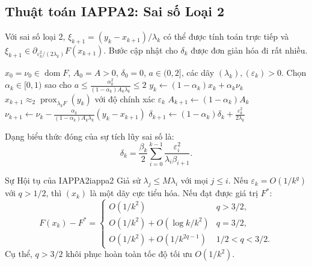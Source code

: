 \documentclass[12pt, a4paper]{article}
\newcommand{\prox}{\operatorname{prox}}
\newcommand{\dom}{\operatorname{dom}}
\begin{document}
\subsection{Thuật toán IAPPA2: Sai số Loại 2}

Với sai số loại 2, $\xi_{k+1}=(y_k-x_{k+1})/\lambda_k$ có thể được tính toán trực tiếp
và $\xi_{k+1}\in\partial_{\varepsilon_k^2/(2\lambda_k)}F(x_{k+1})$.
Bước cập nhật cho $\delta_k$ được đơn giản hóa đi rất nhiều.

\begin{algorithm}[H]
\caption{IAPPA2 --- Thuật toán PPA Gia tốc Không chính xác với Sai số Loại 2}
\label{alg:iappa2}
\begin{algorithmic}[1]
\Require $x_0=\nu_0\in\dom F$, $A_0=A>0$, $\delta_0=0$, $a\in(0,2]$,
         các dãy $(\lambda_k),(\varepsilon_k)>0$.
  \State Chọn $\alpha_k\in[0,1)$ sao cho
         $a\le\tfrac{\alpha_k^2}{(1-\alpha_k)A_k\lambda_k}\le 2$
  \State $y_k\leftarrow(1-\alpha_k)x_k+\alpha_k\nu_k$
  \State $x_{k+1}\approx_2\prox_{\lambda_k F}(y_k)$
         với độ chính xác $\varepsilon_k$
  \State $A_{k+1}\leftarrow(1-\alpha_k)A_k$
  \State $\nu_{k+1}\leftarrow\nu_k
         -\tfrac{\alpha_k}{(1-\alpha_k)A_k\lambda_k}(y_k-x_{k+1})$
  \State $\delta_{k+1}\leftarrow(1-\alpha_k)\delta_k
         +\tfrac{\varepsilon_k^2}{2\lambda_k}$
\EndFor
\end{algorithmic}
\end{algorithm}

Dạng biểu thức đóng của sự tích lũy sai số là:
\begin{equation}\label{eq:delta2}
  \delta_k = \frac{\beta_k}{2}
             \sum_{i=0}^{k-1}\frac{\varepsilon_i^2}{\lambda_i\beta_{i+1}}.
\end{equation}

\begin{theorem}{Sự Hội tụ của IAPPA2}{iappa2}
Giả sử $\lambda_j\le M\lambda_i$ với mọi $j\le i$.
Nếu $\varepsilon_k=O(1/k^q)$ với $q>1/2$, thì $(x_k)$ là một dãy cực tiểu hóa.
Nếu đạt được giá trị $F^*$:
\[
  F(x_k)-F^* =
  \begin{cases}
    O(1/k^2)                       & q>3/2,\\
    O(1/k^2)+O(\log k/k^2)         & q=3/2,\\
    O(1/k^2)+O(1/k^{2q-1})         & 1/2<q<3/2.
  \end{cases}
\]
Cụ thể, $q>3/2$ khôi phục hoàn toàn tốc độ tối ưu $O(1/k^2)$.
\end{theorem}
\end{document}
